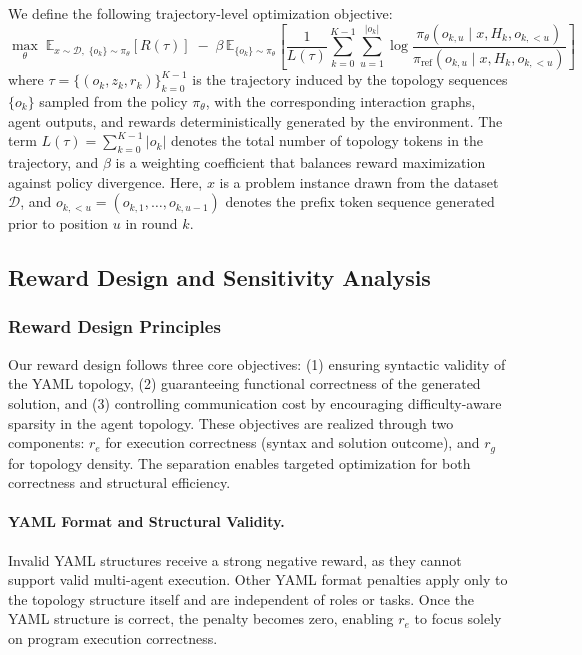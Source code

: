 \documentclass{article}
\theoremstyle{definition}
\begin{document}
We define the following trajectory-level optimization objective:
\begin{equation}\label{eq:rl_objective}
\max_{\theta} \; \mathbb{E}_{x \sim \mathcal{D},\; \{o_k\} \sim \pi_\theta}\! \left[ R(\tau) \right] 
\; - \; \beta \, \mathbb{E}_{\{o_k\} \sim \pi_\theta}\! \left[ \frac{1}{L(\tau)} 
\sum_{k=0}^{K-1} \sum_{u=1}^{|o_k|} 
\log \frac{ \pi_\theta(o_{k,u} \mid x, H_k, o_{k,<u}) }{ \pi_{\mathrm{ref}}(o_{k,u} \mid x, H_k, o_{k,<u}) } \right]
\end{equation}
where $\tau = \{(o_k, z_k, r_k)\}_{k=0}^{K-1}$ is the trajectory induced by the topology sequences $\{o_k\}$ sampled from the policy $\pi_\theta$, with the corresponding interaction graphs, agent outputs, and rewards deterministically generated by the environment. The term $L(\tau) = \sum_{k=0}^{K-1} |o_k|$ denotes the total number of topology tokens in the trajectory, and $\beta$ is a weighting coefficient that balances reward maximization against policy divergence. Here, $x$ is a problem instance drawn from the dataset $\mathcal{D}$, and $o_{k,<u} = (o_{k,1}, \ldots, o_{k,u-1})$ denotes the prefix token sequence generated prior to position $u$ in round $k$.


\subsection{Reward Design and Sensitivity Analysis}

\subsubsection{Reward Design Principles}

Our reward design follows three core objectives:  
(1) ensuring syntactic validity of the YAML topology,  
(2) guaranteeing functional correctness of the generated solution, and (3) controlling communication cost by encouraging difficulty-aware sparsity in the agent topology. These objectives are realized through two components: $r_e$ for execution correctness (syntax and solution outcome), and $r_g$ for topology density. The separation enables targeted optimization for both correctness and structural efficiency.

\paragraph{YAML Format and Structural Validity.}
Invalid YAML structures receive a strong negative reward, as they cannot support valid multi-agent execution. Other YAML format penalties apply only to the topology structure itself and are independent of roles or tasks. Once the YAML structure is correct, the penalty becomes zero, enabling $r_e$ to focus solely on program execution correctness.
\end{document}
